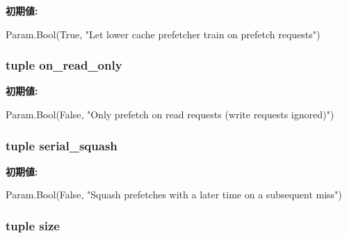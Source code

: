 {\bfseries 初期値:}
\begin{DoxyCode}
Param.Bool(True,
         "Let lower cache prefetcher train on prefetch requests")
\end{DoxyCode}
\hypertarget{classPrefetcher_1_1BasePrefetcher_a3f1aca2bea28c435d912ee480beee72b}{
\subsubsection[{on\_\-read\_\-only}]{\setlength{\rightskip}{0pt plus 5cm}tuple on\_\-read\_\-only}}
\label{classPrefetcher_1_1BasePrefetcher_a3f1aca2bea28c435d912ee480beee72b}
{\bfseries 初期値:}
\begin{DoxyCode}
Param.Bool(False,
         "Only prefetch on read requests (write requests ignored)")
\end{DoxyCode}
\hypertarget{classPrefetcher_1_1BasePrefetcher_a73e837ffabf56c7c76342acc48b4da48}{
\subsubsection[{serial\_\-squash}]{\setlength{\rightskip}{0pt plus 5cm}tuple serial\_\-squash}}
\label{classPrefetcher_1_1BasePrefetcher_a73e837ffabf56c7c76342acc48b4da48}
{\bfseries 初期値:}
\begin{DoxyCode}
Param.Bool(False,
         "Squash prefetches with a later time on a subsequent miss")
\end{DoxyCode}
\hypertarget{classPrefetcher_1_1BasePrefetcher_a377e5da8df1f89c5468c8b8cd07eac89}{
\subsubsection[{size}]{\setlength{\rightskip}{0pt plus 5cm}tuple size}}
